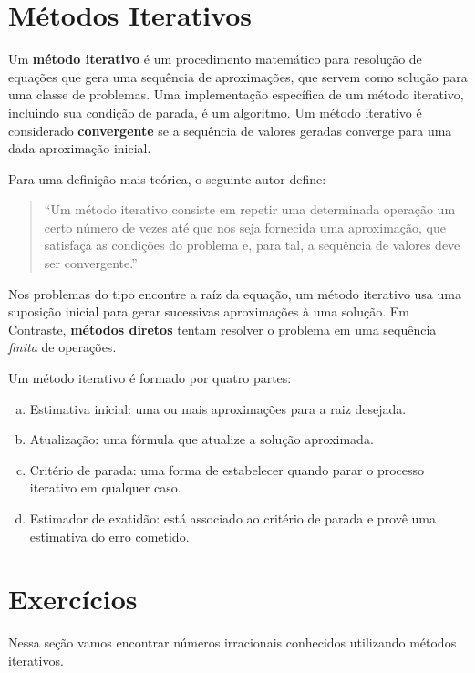 \section{Métodos Iterativos}

Um \textbf{método iterativo} é um procedimento matemático para resolução de
equações que gera uma sequência de aproximações, que servem como solução para
uma classe de problemas. Uma implementação específica de um método iterativo,
incluindo sua condição de parada, é um algoritmo. Um método iterativo é
considerado \textbf{convergente} se a sequência de valores geradas converge para
uma dada aproximação inicial.

Para uma definição mais teórica, o seguinte autor define:

\begin{quotation}

``Um método iterativo consiste em repetir uma determinada operação um certo número
de vezes até que nos seja fornecida uma aproximação, que satisfaça as condições
do problema e, para tal, a sequência de valores deve ser
convergente.''\cite{batista2014metodos}

\end{quotation}

Nos problemas do tipo encontre a raíz da equação, um método iterativo usa
uma suposição inicial para gerar sucessivas aproximações à uma solução. Em
Contraste, \textbf{métodos diretos} tentam resolver o problema em uma sequência
\emph{finita} de operações.

Um método iterativo é formado por quatro partes:~\cite{claudio2000calculo}

\begin{enumerate}[a)]
	\item Estimativa inicial: uma ou mais aproximações para a raiz desejada.
    \item Atualização: uma fórmula que atualize a solução aproximada.
    \item Critério de parada: uma forma de estabelecer quando parar o processo iterativo em qualquer caso.
    \item Estimador de exatidão: está associado ao critério de parada e provê uma estimativa do erro cometido.
\end{enumerate}

\newpage

\section{Exercícios}
Nessa seção vamos encontrar números irracionais conhecidos utilizando métodos iterativos.

